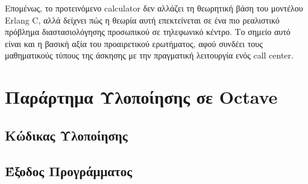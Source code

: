 \documentclass{article}
\begin{document}
Επομένως, το προτεινόμενο \foreignlanguage{english}{calculator} δεν αλλάζει τη θεωρητική βάση του μοντέλου Erlang C, αλλά δείχνει πώς η θεωρία αυτή επεκτείνεται σε ένα πιο ρεαλιστικό πρόβλημα διαστασιολόγησης προσωπικού σε τηλεφωνικό κέντρο. Το σημείο αυτό είναι και η βασική αξία του προαιρετικού ερωτήματος, αφού συνδέει τους μαθηματικούς τύπους της άσκησης με την πραγματική λειτουργία ενός call center.

\newpage
\section{Παράρτημα Υλοποίησης σε Octave}

\subsection{Κώδικας Υλοποίησης}


\newpage
\subsection{Έξοδος Προγράμματος}

\end{document}

